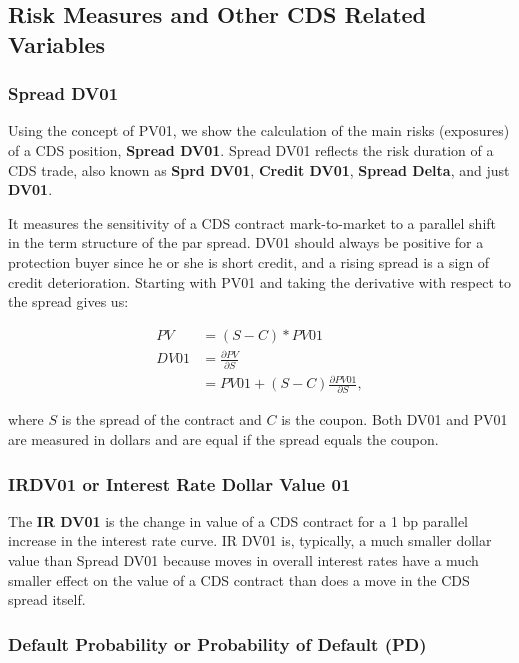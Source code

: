 \documentclass[article]{jss}
\begin{document}
\subsection{Risk Measures and Other CDS Related Variables}
\label{sec:RiskMeasures}

\subsubsection{Spread DV01}
\label{sec:spread.DV.01}

Using the concept of PV01, we show the calculation of the main risks (exposures) of a CDS position, \textbf{Spread DV01}. Spread DV01 reflects the risk duration of a CDS trade, also known as \textbf{Sprd DV01}, \textbf{Credit DV01}, \textbf{Spread Delta}, and just
\textbf{DV01}. 

It measures the sensitivity of a CDS contract mark-to-market to a parallel shift in the term structure of the par spread. DV01 should always be positive for a protection buyer since he or she is short credit, and a rising spread is a sign of credit deterioration. Starting with PV01 and taking the derivative with respect to the spread gives us:

\begin{align*}
  PV &= (S - C) * PV01 \\
  DV01 &= \frac{\partial PV}{\partial S} \\
  &= PV01 + (S - C) \frac{\partial PV01}{\partial S},
\end{align*}

where $S$ is the spread of the contract and $C$ is the coupon. Both DV01 and PV01 are measured in dollars and are equal if the spread
equals the coupon.

\subsubsection{IRDV01 or Interest Rate Dollar Value 01}
\label{sec:IRDV01}

The \textbf{IR DV01} is the change in value of a CDS contract for a 1 bp parallel increase in the interest rate curve. IR DV01 is, typically, a much smaller dollar value than Spread DV01 because moves in overall interest rates have a much smaller effect on the value of a CDS contract than does a move in the CDS spread itself. 

\subsubsection{Default Probability or Probability of Default (PD)}
\label{sec:DefaultProb}
\end{document}
